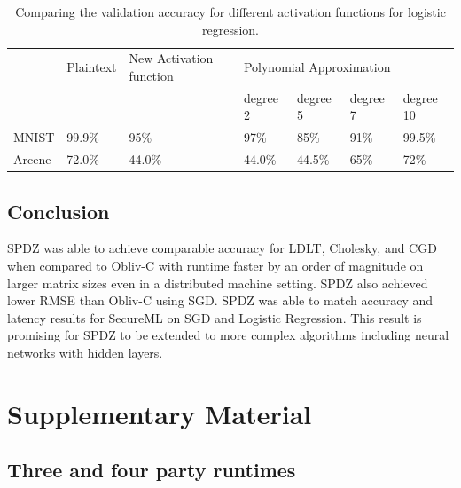 \documentclass{article}
\begin{document}
\begin{table}[h!] 
\caption{Comparing the validation accuracy for different activation functions for logistic regression.}
\centering
\label{my-label}
\begin{tabular}{@{}lllllll@{}}
\toprule
       & Plaintext & New Activation function & \multicolumn{4}{l}{Polynomial Approximation} \\
       &           &                         & degree 2  & degree 5  & degree 7 & degree 10 \\ \midrule
MNIST  & 99.9\%    & 95\%                    & 97\%      & 85\%      & 91\%     & 99.5\%    \\
Arcene & 72.0\%    &           44.0\%              &   44.0\%        &    44.5\%       &    65\%      &    72\%       \\ \bottomrule
\end{tabular}
\vspace{-4mm}
\label{tbl1}
\end{table}

\subsection{Conclusion}

SPDZ was able to achieve comparable accuracy for LDLT, Cholesky, and CGD when compared to Obliv-C with runtime faster by an order of magnitude on larger matrix sizes even in a distributed machine setting. SPDZ also achieved lower RMSE than Obliv-C using SGD. SPDZ was able to match accuracy and latency results for SecureML on SGD and Logistic Regression. This result is promising for SPDZ to be extended to more complex algorithms including neural networks with hidden layers.





\newpage 

\section*{Supplementary Material}

\subsection{Three and four party runtimes}
\end{document}
